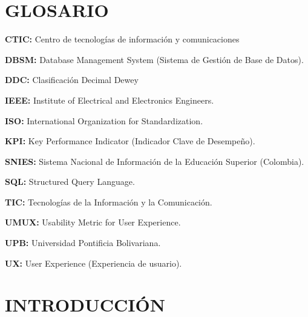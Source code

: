\documentclass[spanish]{ieee_upb}
\begin{document}
\newpage
\section*{GLOSARIO}
\textbf{CTIC: } Centro de tecnologías de información y comunicaciones

\vspace{0.1cm}
\textbf{DBSM: } Database Management System (Sistema de Gestión de Base de Datos).

\vspace{0.1cm}
\textbf{DDC: } Clasificación Decimal Dewey

\vspace{0.1cm}
\textbf{IEEE: } Institute of Electrical and Electronics Engineers. 

\vspace{0.1cm}
\textbf{ISO: } International Organization for Standardization.

\vspace{0.1cm}
\textbf{KPI: } Key Performance Indicator (Indicador Clave de Desempeño). 

\vspace{0.1cm}
\textbf{SNIES: } Sistema Nacional de Información de la Educación Superior (Colombia). 

\vspace{0.1cm}
\textbf{SQL: } Structured Query Language. 

\vspace{0.1cm}
\textbf{TIC: } Tecnologías de la Información y la Comunicación.

\vspace{0.1cm}
\textbf{UMUX: } Usability Metric for User Experience.

\vspace{0.1cm}
\textbf{UPB: } Universidad Pontificia Bolivariana.

\vspace{0.1cm}
\textbf{UX: } User Experience (Experiencia de usuario). 


%
%

\newpage
\section{INTRODUCCIÓN}
\end{document}
